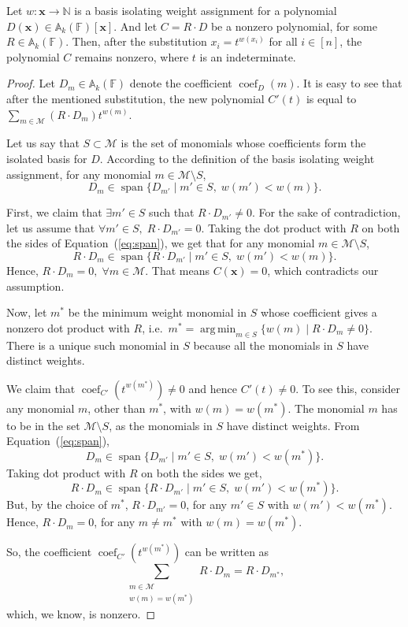 \documentclass[final,oneeqnum, onethmnum, onefignum]{siamltex1213}
\newcommand{\N}{\mathbb N}
\newcommand{\A}{\mathbb A}
\newcommand{\F}{\mathbb F}
\newcommand{\M}{\mathcal M}
\newcommand{\coeff}{\operatorname{coef}}
\DeclareMathOperator*{\argmin}{arg \, min}
\DeclareMathOperator{\Span}{span}
\newcommand{\x}{\mathbf{x}}
\begin{document}
\begin{lemma}
\label{lem:basisIsolation}
Let $w \colon \mathbf{x} \to \N$ is a basis isolating weight assignment
for a polynomial $D(\mathbf{x}) \in \A_k(\F)[\mathbf{x}]$. 
And let $C = R \cdot D$ be a nonzero polynomial, for some $R \in \A_k(\F)$.
Then, after the substitution $x_i = t^{w(x_i)} $ for all $i \in [n]$,
the polynomial $C$ remains nonzero, where $t$ is an indeterminate.
\end{lemma}
\begin{proof}
Let $D_m \in \A_k(\F)$ denote the coefficient $\coeff_D(m)$.
It is easy to see that after the mentioned substitution, 
the new polynomial $C'(t)$ %
is equal to
$\sum_{m \in \M} (R \cdot D_m) t^{w(m)}$. 

Let us say that $S \subset \M$ is the set of monomials whose coefficients
form the isolated basis for $D$.
According to the definition of the basis isolating weight assignment,
for any monomial $m \in \M \setminus S$, 
\begin{equation}
\label{eq:span}
 D_m \in \Span \{D_{m'} \mid m' \in S, \; w(m') < w(m) \}.
\end{equation}

First, we claim that $\exists m' \in S$ such that $ R \cdot D_{m'} \neq 0$.
For the sake of contradiction, let us assume that 
$\forall m' \in S, \; R \cdot D_{m'} = 0$.
Taking the dot product with $R$ on both the sides of Equation~(\ref{eq:span}),
we get that for any monomial $m \in \M \setminus S$,
$$ R \cdot D_m \in \Span \{R \cdot D_{m'} \mid m' \in S, \; w(m') < w(m) \}.$$
Hence, $R \cdot D_m = 0, \; \forall m \in \M$. 
That means $C(\x) =0$, which contradicts our assumption.

Now, let $m^*$ be the minimum weight monomial in $S$ whose coefficient
gives a nonzero dot product with $R$, i.e.\ 
$m^* = \displaystyle\argmin_{m \in S} \{w(m) \mid R \cdot D_m \neq 0\}$.
There is a unique such monomial in $S$ because all the monomials in 
$S$ have distinct weights.

We claim that $\coeff_{C'}(t^{w(m^*)}) \neq 0$
and hence $C'(t) \neq 0$.
To see this, consider any monomial $m$, other than $m^*$, with $w(m) = w(m^*)$.
The monomial $m$ has to be in the set $\M \setminus S$, as the monomials in $S$ 
have distinct weights.
From Equation~(\ref{eq:span}),
$$
 D_m \in \Span \{D_{m'} \mid m' \in S, \; w(m') < w(m^*) \}.
$$
Taking dot product with $R$ on both the sides we get,
$$
 R \cdot D_m \in \Span \{ R \cdot D_{m'} \mid m' \in S, \; w(m') < w(m^*) \}.
$$
But, by the choice of $m^*$, $R \cdot D_{m'} = 0$,
for any $m' \in S$ with $w(m') < w(m^*)$.
Hence, $R \cdot D_m = 0$, for any $m \neq m^*$ with $w(m) = w(m^*)$.

So, the coefficient $\coeff_{C'}(t^{w(m^*)})$ can be written as
$$ \sum_{\substack {m \in \M \\ w(m) = w(m^*)} } R \cdot D_m = 
R \cdot D_{m^*},
 $$
which, we know, is nonzero.
\end{proof}
\end{document}
